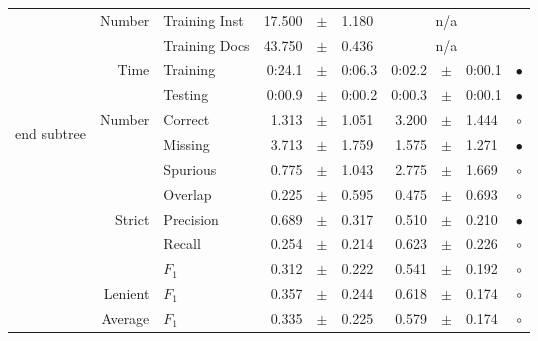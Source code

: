 \begin{longtable}{|r|r|l||rcl|rcl|c|}
\cline{2-10} & \multirow{2}{*}{    Number} &   Training Inst &      17.500 &  $\pm$  &       1.180 &    \multicolumn{3}{c|}{n/a}         &  \\
\cline{3-10} &                             &   Training Docs &      43.750 &  $\pm$  &       0.436 &    \multicolumn{3}{c|}{n/a}         &  \\
\cline{2-10} & \multirow{2}{*}{      Time} &        Training &      0:24.1 &  $\pm$  &      0:06.3 &      0:02.2 &  $\pm$  &      0:00.1 & $\bullet$ \\
\cline{3-10} &                             &         Testing &      0:00.9 &  $\pm$  &      0:00.2 &      0:00.3 &  $\pm$  &      0:00.1 & $\bullet$ \\
\hline
\hline
\multirow{11}{*}{\begin{sideways}end subtree\end{sideways} }
             & \multirow{4}{*}{    Number} &         Correct &       1.313 &  $\pm$  &       1.051 &       3.200 &  $\pm$  &       1.444 & $\circ$ \\
\cline{3-10} &                             &         Missing &       3.713 &  $\pm$  &       1.759 &       1.575 &  $\pm$  &       1.271 & $\bullet$ \\
\cline{3-10} &                             &        Spurious &       0.775 &  $\pm$  &       1.043 &       2.775 &  $\pm$  &       1.669 & $\circ$ \\
\cline{3-10} &                             &         Overlap &       0.225 &  $\pm$  &       0.595 &       0.475 &  $\pm$  &       0.693 & $\circ$ \\
\cline{2-10} & \multirow{3}{*}{    Strict} &       Precision &       0.689 &  $\pm$  &       0.317 &       0.510 &  $\pm$  &       0.210 & $\bullet$ \\
\cline{3-10} &                             &          Recall &       0.254 &  $\pm$  &       0.214 &       0.623 &  $\pm$  &       0.226 & $\circ$ \\
\cline{3-10} &                             &           $F_1$ &       0.312 &  $\pm$  &       0.222 &       0.541 &  $\pm$  &       0.192 & $\circ$ \\
\cline{2-10} &                     Lenient &           $F_1$ &       0.357 &  $\pm$  &       0.244 &       0.618 &  $\pm$  &       0.174 & $\circ$ \\
\cline{2-10} &                     Average &           $F_1$ &       0.335 &  $\pm$  &       0.225 &       0.579 &  $\pm$  &       0.174 & $\circ$ \\

\end{longtable}

